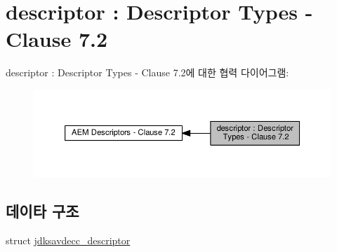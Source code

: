 \hypertarget{group__descriptor}{}\section{descriptor \+: Descriptor Types -\/ Clause 7.2}
\label{group__descriptor}
descriptor \+: Descriptor Types -\/ Clause 7.2에 대한 협력 다이어그램\+:
\nopagebreak
\begin{figure}[H]
\begin{center}
\leavevmode
\includegraphics[width=350pt]{group__descriptor}
\end{center}
\end{figure}
\subsection*{데이타 구조}
\begin{DoxyCompactItemize}
\item 
struct \hyperlink{structjdksavdecc__descriptor}{jdksavdecc\+\_\+descriptor}
\end{DoxyCompactItemize}
